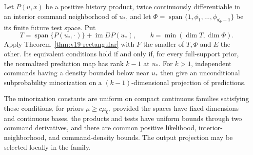 \begin{corollary}
\label{cor:v19-rectangular-history}
Let $P(u,x)$ be a positive history product, twice continuously
differentiable in an interior command neighborhood of $u_*$, and let
$\Phi=\operatorname{span}\{1,\phi_1,\ldots,\phi_{d_\Phi-1}\}$
be its finite future test space. Put
\[
 T=\operatorname{span}\{P(u_*,\cdot)\}+\operatorname{im}DP(u_*),
 \qquad k=\min(\dim T,\dim\Phi).
\]
Apply Theorem~\ref{thm:v19-rectangular} with $F$ the smaller of
$T,\Phi$ and $E$ the other. Its equivalent conditions hold if and only
if, for every full-support prior, the normalized prediction map has
rank $k-1$ at $u_*$. For $k>1$, independent commands having a density
bounded below near $u_*$ then give an unconditional subprobability
minorization on a $(k-1)$-dimensional projection of predictions.

The minorization constants are uniform on compact continuous families
satisfying these conditions, for priors $\mu\ge c\mu_0$, provided the
spaces have fixed dimensions and continuous bases, the products and
tests have uniform bounds through two command derivatives, and there
are common positive likelihood, interior-neighborhood, and command-density
bounds. The output projection may be selected locally in the family.
\end{corollary}
